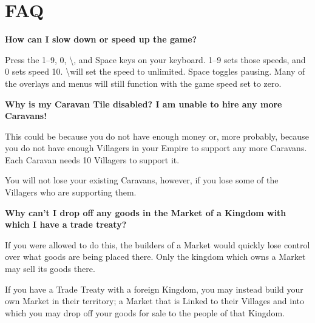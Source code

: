 
\chapter[FAQ]{{\Huge FAQ}}


{\large \textbf{\textsf{How can I slow down or speed up the game?}}}

Press the 1–9, 0, \textbackslash, and Space keys on your keyboard.  1–9 sets
those speeds, and 0 sets speed 10.  \textbackslash will set the speed to
unlimited.  Space toggles pausing.  Many of the overlays and menus will still
function with the game speed set to zero.

{\large \textbf{\textsf{Why is my Caravan Tile disabled? I am unable to hire any more Caravans!}}}

This could be because you do not have enough money or, more probably, because you do not have enough Villagers in your Empire to support any more Caravans. Each Caravan needs 10 Villagers to support it.

You will not lose your existing Caravans, however, if you lose some of the Villagers who are supporting them.

{\large \textbf{\textsf{Why can’t I drop off any goods in the Market of a Kingdom with which I have a trade treaty?}}}

If you were allowed to do this, the builders of a Market would quickly lose control over what goods are being placed there. Only the kingdom which owns a Market may sell its goods there.

If you have a Trade Treaty with a foreign Kingdom, you may instead build your own Market in their territory; a Market that is Linked to their Villages and into which you may drop off your goods for sale to the people of that Kingdom.

